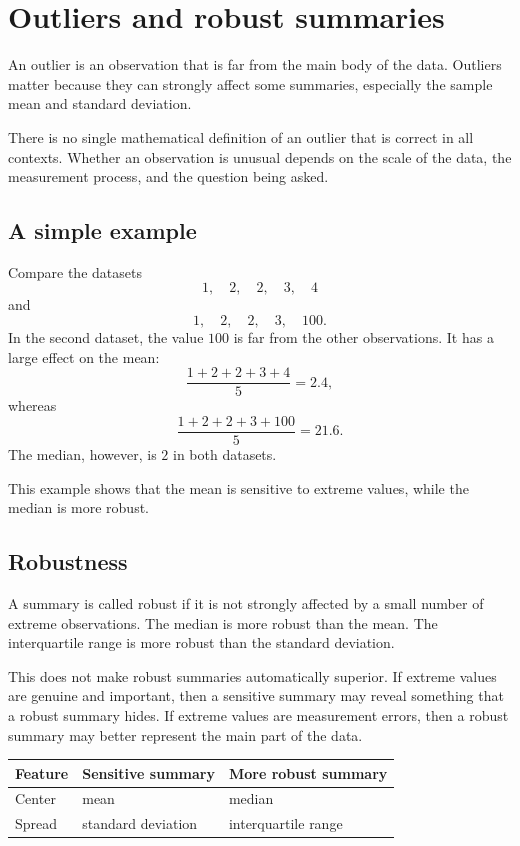 \section{Outliers and robust summaries}

An outlier is an observation that is far from the main body of the data. Outliers
matter because they can strongly affect some summaries, especially the sample
mean and standard deviation.

There is no single mathematical definition of an outlier that is correct in all
contexts. Whether an observation is unusual depends on the scale of the data, the
measurement process, and the question being asked.

\subsection*{A simple example}

Compare the datasets
\[
1,\quad 2,\quad 2,\quad 3,\quad 4
\]
and
\[
1,\quad 2,\quad 2,\quad 3,\quad 100.
\]
In the second dataset, the value \(100\) is far from the other observations. It
has a large effect on the mean:
\[
\frac{1+2+2+3+4}{5}=2.4,
\]
whereas
\[
\frac{1+2+2+3+100}{5}=21.6.
\]
The median, however, is \(2\) in both datasets.

This example shows that the mean is sensitive to extreme values, while the
median is more robust.

\subsection*{Robustness}

A summary is called robust if it is not strongly affected by a small number of
extreme observations. The median is more robust than the mean. The interquartile
range is more robust than the standard deviation.

This does not make robust summaries automatically superior. If extreme values
are genuine and important, then a sensitive summary may reveal something that a
robust summary hides. If extreme values are measurement errors, then a robust
summary may better represent the main part of the data.

\begin{center}
\begin{tabular}{lll}
\toprule
Feature & Sensitive summary & More robust summary \\
\midrule
Center & mean & median \\
Spread & standard deviation & interquartile range \\
\bottomrule
\end{tabular}
\end{center}


